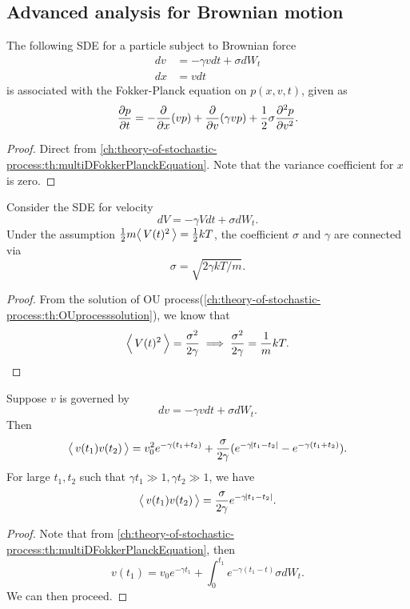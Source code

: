 \begin{refsection}
\section{Advanced analysis for Brownian motion}
\begin{lemma}
	The following SDE for a particle subject to Brownian force 
	\begin{align*}
	dv &= -\gamma v dt + \sigma dW_t \\
	dx &= vdt
	\end{align*}
	is associated with the Fokker-Planck equation on $p(x,v,t)$, given as 
	$$\frac{\partial p}{\partial t} = -\frac{\partial }{\partial x} (vp) + \frac{\partial}{\partial v}(\gamma v p) + \frac{1}{2}\sigma \frac{\partial^2 p}{\partial v^2}.$$
\end{lemma}
\begin{proof}
	Direct from \autoref{ch:theory-of-stochastic-process:th:multiDFokkerPlanckEquation}. Note that the variance coefficient for $x$ is zero.
\end{proof}




\begin{theorem}\cite[3]{risken2012fokker}\label{ch:theory-of-stochastic-process:fluctuation-dissipationtheoremRandomforce}
	Consider the SDE for velocity
	$$dV = -\gamma V dt + \sigma dW_t.$$
	Under the assumption $\frac{1}{2}m{\left< \, V(t)^2 \, \right>} = \frac{1}{2}kT$, the coefficient $\sigma$ and $\gamma$ are connected via
	$$\sigma = \sqrt{2\gamma kT/m}.$$
\end{theorem}
\begin{proof}
	From the solution of OU process(\autoref{ch:theory-of-stochastic-process:th:OUprocesssolution}), we know that $${\left< \, V(t)^2 \, \right>} = \frac{\sigma^2}{2\gamma } \implies \frac{\sigma^2}{2\gamma } = \frac{1}{m}kT.$$
\end{proof}


\begin{lemma}\cite[34]{risken2012fokker}
	Suppose $v$ is governed by 
	$$dv = -\gamma v dt + \sigma dW_t.$$
	Then
	$${\left< \, v(t_1)v(t_2) \, \right>} = v_0^2 e^{-\gamma(t_1+t_2)} + \frac{\sigma}{2\gamma}(e^{-\gamma\abs{t_1-t_2}} - e^{-\gamma(t_1+t_2)}).$$
	For large $t_1,t_2$ such that $\gamma t_1 \gg 1, \gamma t_2\gg 1$, we have
	$${\left< \, v(t_1)v(t_2) \, \right>} =  \frac{\sigma}{2\gamma}e^{-\gamma\abs{t_1-t_2}}.$$
\end{lemma}
\begin{proof}
	Note that from \autoref{ch:theory-of-stochastic-process:th:multiDFokkerPlanckEquation}, then
	$$v(t_1) = v_0e^{-\gamma t_1} + \int_0^{t_1}e^{-\gamma(t_1-t)}\sigma dW_t.$$
	We can then proceed.
\end{proof}



\end{refsection}

